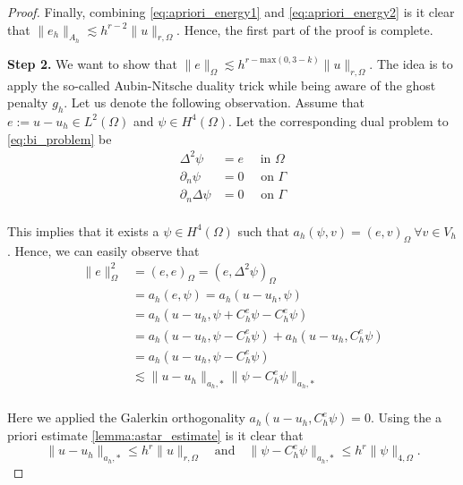 \begin{proof}
Finally, combining \eqref{eq:apriori_energy1} and \eqref{eq:apriori_energy2} is it clear that $\| e_{h} \|_{ A_{h}  }^{  } \lesssim h^{r-2} \| u \|_{r, \Omega   }^{  }  $.
Hence, the first part of the proof is complete.

        \textbf{Step 2.}
        We want to show that $ \| e \|_{ \Omega  }^{  } \lesssim   h^{r- \mathrm{max}(0,3-k)} \| u \|_{ r ,\Omega  }^{  }$. The idea is to apply the so-called Aubin-Nitsche duality trick while being aware of the ghost penalty $g_{h}$. Let us denote the following
        observation.
        Assume that $e:= u -u_{h} \in L^{2}( \Omega ) $ and $\psi  \in H^{4}( \Omega ) $.
        Let the corresponding dual problem to \eqref{eq:bi_problem} be
        \begin{equation}
            \begin{split}
            \Delta ^2 \psi &= e  \quad  \text{ in } \Omega  \\
            \partial _{n} \psi &= 0 \quad \text{ on } \Gamma \\
            \partial _{n} \Delta \psi & = 0 \quad  \text{ on } \Gamma   \\
            \end{split}
        \end{equation}

        This implies that it exists a $\psi \in H^{4}( \Omega ) $ such that $a_{h}( \psi, v ) = ( e,v)_{\Omega } \ \forall v \in V_{h}  $. Hence, we can easily observe that \begin{equation}
            \label{eq:ni_1}
            \begin{split}
        \| e \|_{ \Omega  }^{ 2 }  & = ( e,e)_\Omega   = ( e, \Delta ^2 \psi )_{\Omega } \\
        &= a_{h}( e, \psi ) = a_{h}( u-u_h, \psi ) \\
        &= a_{h}( u-u_h, \psi + C^{e}_{h}\psi  - C^{e}_{h}\psi )  \\
        &= a_{h}( u-u_h, \psi   - C^{e}_{h}\psi ) +  a_{h}( u-u_h, C^{e}_{h}\psi )  \\
        &= a_{h}( u-u_h, \psi  - C^{e}_{h}\psi )  \\
        & \lesssim    \|u-u_{h}  \|_{a_{h},*  }^{  }  \| \psi  - C^{e}_{h}\psi \|_{a_{h},*  }^{  }    \\
            \end{split}
        \end{equation}

        Here we applied the Galerkin orthogonality $ a_{h}( u-u_{h}, C^{e}_{h}\psi ) = 0$.
        Using the a priori estimate \eqref{lemma:astar_estimate}  is it clear that
        \begin{equation}
            \label{eq:ni_2}
        \|u-u_{h}  \|_{a_{h},*  }^{  }  \le h^{r} \| u \|_{r,\Omega  }^{  }\quad  \text{and}\quad  \| \psi  - C^{e}_{h}\psi \|_{a_{h},*  }^{  }  \le h^{r} \| \psi  \|_{4, \Omega   }^{  }.
        \end{equation}


\end{proof}
